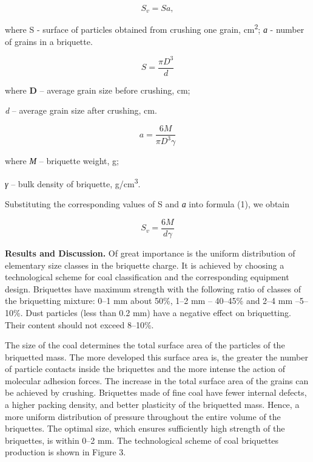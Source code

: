 \begin{multicols}{2}
\begin{equation}
S_v = Sa,
\end{equation}

where S - surface of particles obtained from crushing one grain,
cm\textsuperscript{2}; \emph{а} - number of grains in a briquette.

\begin{equation}
    S = \frac{\pi D^3}{d}
\end{equation}

where {\bfseries D} -- average grain size before crushing, cm;

\emph{d} -- average grain size after crushing, cm.

\begin{equation}
    a = \frac{6M}{\pi D^3 \gamma}
\end{equation}

where \emph{М} -- briquette weight, g;

\emph{γ} -- bulk density of briquette, g/cm\textsuperscript{3}.

Substituting the corresponding values \hspace{0pt}\hspace{0pt}of S and
\emph{а} into formula (1), we obtain

\begin{equation}
    S_v = \frac{6M}{d\gamma}
\end{equation}

{\bfseries Results and Discussion.} Of great importance is the uniform
distribution of elementary size classes in the briquette charge. It is
achieved by choosing a technological scheme for coal classification and
the corresponding equipment design. Briquettes have maximum strength
with the following ratio of classes of the briquetting mixture: 0--1 mm
about 50\%, 1--2 mm -- 40--45\% and 2--4 mm --5--10\%. Dust particles
(less than 0.2 mm) have a negative effect on briquetting. Their content
should not exceed 8--10\%.

The size of the coal determines the total surface area of
\hspace{0pt}\hspace{0pt}the particles of the briquetted mass. The more
developed this surface area is, the greater the number of particle
contacts inside the briquettes and the more intense the action of
molecular adhesion forces. The increase in the total surface area of
\hspace{0pt}\hspace{0pt}the grains can be achieved by crushing.
Briquettes made of fine coal have fewer internal defects, a higher
packing density, and better plasticity of the briquetted mass. Hence, a
more uniform distribution of pressure throughout the entire volume of
the briquettes. The optimal size, which ensures sufficiently high
strength of the briquettes, is within 0--2 mm. The technological scheme
of coal briquettes production is shown in Figure 3.
\end{multicols}

